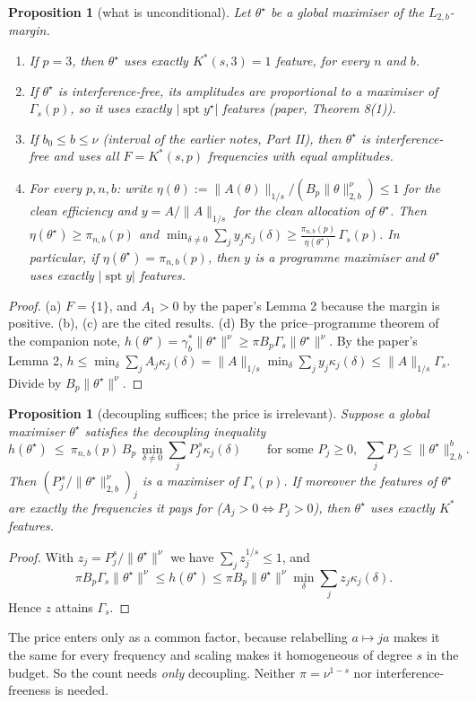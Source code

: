 \documentclass[11pt]{article}
\newtheorem{proposition}[theorem]{Proposition}
\theoremstyle{definition}
\begin{document}
\begin{proposition}[what is unconditional]\label{prop:count}
Let $\theta^\star$ be a global maximiser of the $L_{2,b}$-margin.
\begin{enumerate}
\item[(a)] If $p=3$, then $\theta^\star$ uses exactly $K^*(s,3)=1$ feature, for every $n$ and $b$.
\item[(b)] If $\theta^\star$ is interference-free, its amplitudes are proportional to a maximiser of $\Gamma_s(p)$, so it uses
exactly $|\operatorname{spt}y^\star|$ features (paper, Theorem 8(1)).
\item[(c)] If $b_0\le b\le\nu$ (interval of the earlier notes, Part II), then $\theta^\star$ is interference-free and uses all
$F=K^*(s,p)$ frequencies with equal amplitudes.
\item[(d)] For every $p,n,b$: write $\eta(\theta):=\|A(\theta)\|_{1/s}/(B_p\|\theta\|_{2,b}^\nu)\le1$ for the clean efficiency
and $y=A/\|A\|_{1/s}$ for the clean allocation of $\theta^\star$.  Then $\eta(\theta^\star)\ge\pi_{n,b}(p)$ and
$\min_{\delta\ne0}\sum_jy_j\kappa_j(\delta)\ge\frac{\pi_{n,b}(p)}{\eta(\theta^\star)}\,\Gamma_s(p)$.  In particular, if
$\eta(\theta^\star)=\pi_{n,b}(p)$, then $y$ is a programme maximiser and $\theta^\star$ uses exactly $|\operatorname{spt}y|$ features.
\end{enumerate}
\end{proposition}
\begin{proof}
(a) $F=\{1\}$, and $A_1>0$ by the paper's Lemma 2 because the margin is positive.  (b), (c) are the cited results.
(d) By the price--programme theorem of the companion note,
$h(\theta^\star)=\gamma^*_b\|\theta^\star\|^\nu\ge\pi B_p\Gamma_s\|\theta^\star\|^\nu$.
By the paper's Lemma 2, $h\le\min_\delta\sum_jA_j\kappa_j(\delta)=\|A\|_{1/s}\min_\delta\sum_jy_j\kappa_j(\delta)\le\|A\|_{1/s}\Gamma_s$.
Divide by $B_p\|\theta^\star\|^\nu$.
\end{proof}

\begin{proposition}[decoupling suffices; the price is irrelevant]\label{prop:dec}
Suppose a global maximiser $\theta^\star$ satisfies the decoupling inequality
\[h(\theta^\star)\ \le\ \pi_{n,b}(p)\,B_p\,\min_{\delta\ne0}\sum_{j}P_j^{\,s}\kappa_j(\delta)\qquad\text{for some }P_j\ge0,\ \ \sum_jP_j\le\|\theta^\star\|_{2,b}^b .\]
Then $(P_j^{\,s}/\|\theta^\star\|^{\nu}_{2,b})_j$ is a maximiser of $\Gamma_s(p)$.  If moreover the features of $\theta^\star$ are exactly
the frequencies it pays for ($A_j>0\iff P_j>0$), then $\theta^\star$ uses exactly $K^*$ features.
\end{proposition}
\begin{proof}
With $z_j=P_j^s/\|\theta^\star\|^\nu$ we have $\sum_jz_j^{1/s}\le1$, and
\[\pi B_p\Gamma_s\|\theta^\star\|^\nu\le h(\theta^\star)\le\pi B_p\|\theta^\star\|^\nu\min_\delta\sum_jz_j\kappa_j(\delta).\]
Hence $z$ attains $\Gamma_s$.
\end{proof}
The price enters only as a common factor, because relabelling $a\mapsto ja$ makes it the same for every frequency and scaling
makes it homogeneous of degree $s$ in the budget.  So the count needs \emph{only} decoupling.  Neither $\pi=\nu^{1-s}$ nor
interference-freeness is needed.
\end{document}
